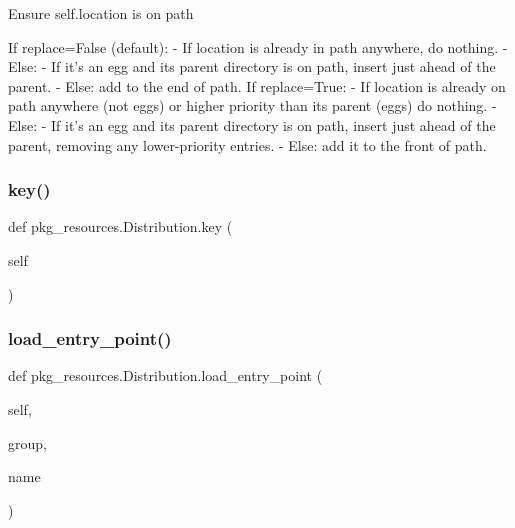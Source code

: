 \begin{DoxyVerb}Ensure self.location is on path

If replace=False (default):
    - If location is already in path anywhere, do nothing.
    - Else:
      - If it's an egg and its parent directory is on path,
insert just ahead of the parent.
      - Else: add to the end of path.
If replace=True:
    - If location is already on path anywhere (not eggs)
      or higher priority than its parent (eggs)
      do nothing.
    - Else:
      - If it's an egg and its parent directory is on path,
insert just ahead of the parent,
removing any lower-priority entries.
      - Else: add it to the front of path.
\end{DoxyVerb}
 \mbox{\label{classpkg__resources_1_1Distribution_aed88aca83c5db4914ee52d4b3e63181d}} 
\subsubsection{\texorpdfstring{key()}{key()}}
{\footnotesize\ttfamily def pkg\+\_\+resources.\+Distribution.\+key (\begin{DoxyParamCaption}\item[{}]{self }\end{DoxyParamCaption})}

\mbox{\label{classpkg__resources_1_1Distribution_a2a3097439745646ac5be811f39c2aca8}} 
\subsubsection{\texorpdfstring{load\+\_\+entry\+\_\+point()}{load\_entry\_point()}}
{\footnotesize\ttfamily def pkg\+\_\+resources.\+Distribution.\+load\+\_\+entry\+\_\+point (\begin{DoxyParamCaption}\item[{}]{self,  }\item[{}]{group,  }\item[{}]{name }\end{DoxyParamCaption})}

